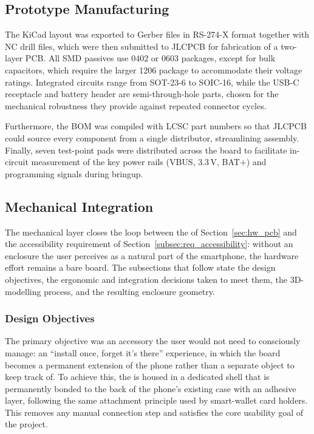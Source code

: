 \documentclass[english,bachelor]{tfgitic}[2026/01/22]
\begin{document}
\subsection{Prototype Manufacturing}
\label{sec:hw_manufacturing}

The KiCad layout was exported to Gerber files in RS-274-X format together with NC drill files, which were then submitted to JLCPCB for fabrication of a two-layer PCB. All SMD passives use 0402 or 0603 packages, except for bulk capacitors, which require the larger 1206 package to accommodate their voltage ratings. Integrated circuits range from SOT-23-6 to SOIC-16, while the USB-C receptacle and battery header are semi-through-hole parts, chosen for the mechanical robustness they provide against repeated connector cycles.

Furthermore, the BOM was compiled with LCSC part numbers so that JLCPCB could source every component from a single distributor, streamlining assembly. Finally, seven test-point pads were distributed across the board to facilitate in-circuit measurement of the key power rails (VBUS, 3.3\,V, BAT+) and programming signals during bringup.

\subsection{Mechanical Integration}
\label{sec:hw_mechanical}

The mechanical layer closes the loop between the  of Section~\ref{sec:hw_pcb} and the accessibility requirement of Section~\ref{subsec:req_accessibility}: without an enclosure the user perceives as a natural part of the smartphone, the hardware effort remains a bare board. The subsections that follow state the design objectives, the ergonomic and integration decisions taken to meet them, the 3D-modelling process, and the resulting enclosure geometry.

\subsubsection{Design Objectives}
\label{subsec:mech_objectives}

The primary objective was an accessory the user would not need to consciously manage: an ``install once, forget it's there'' experience, in which the board becomes a permanent extension of the phone rather than a separate object to keep track of. To achieve this, the  is housed in a dedicated shell that is permanently bonded to the back of the phone's existing case with an adhesive layer, following the same attachment principle used by smart-wallet card holders. This removes any manual connection step and satisfies the core usability goal of the project.
\end{document}
